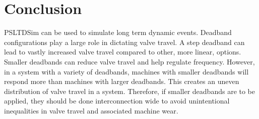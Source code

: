 \section{Conclusion}
PSLTDSim can be used to simulate long term dynamic events.
Deadband configurations play a large role in dictating valve travel.
A step deadband can lead to vastly increased valve travel compared to other, more linear, options.
Smaller deadbands can reduce valve travel and help regulate frequency.
However, in a system with a variety of deadbands, machines with smaller deadbands will respond more than machines with larger deadbands.
This creates an uneven distribution of valve travel in a system.
Therefore, if smaller deadbands are to be applied, they should be done interconnection wide to avoid unintentional inequalities in valve travel and associated machine wear.